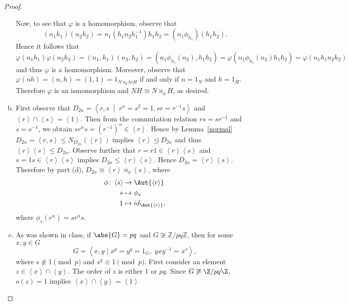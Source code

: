 \documentclass[10pt]{amsart}
\begin{document}
\begin{thm}
\begin{proof}
\begin{enumerate}[(a)]
      Now, to see that $\varphi$ is a homomorphism, observe that 
      $$(n_1h_1)(n_2h_2) = n_1(h_1n_2h_1^{-1})h_1h_2 = (n_1\phi_{h_1})(h_1h_2).$$
      Hence it follows that
      $$\varphi(n_1h_1)\varphi(n_2h_2) = (n_1, h_1)(n_2,h_2) = (n_1\phi_{h_1}(n_2), h_1h_2) = \varphi(n_1\phi_{h_1}(n_2)h_1h_2) = \varphi(n_1h_1n_2h_2)$$
      and thus $\varphi$ is a homomorphism.
      Moreover, observe that $\varphi(nh) = (n,h) = (1,1) = 1_{N \rtimes_phi H}$ if and only if $n = 1_N$ and $h = 1_H$.
      Therefore $\varphi$ is an ismomorphism and $NH \cong N \rtimes_{\phi} H$, as desired.
    \item
      First observe that $D_{2n} = \left< r, s \;\middle\vert\; r^n = s^2 = 1, sr = r^{-1}s\right>$ and $\left<r\right> \cap \left<s\right> = \left<1\right>$.
      Then from the commutation relation $rs = sr^{-1}$ and $s = s^{-1}$, we obtain $sr^\alpha s = (r^{-1})^\alpha \in \left<r\right>$.
      Hence by Lemma~\ref{normal} $D_{2n} = \left<r, s\right> \leq N_{D_{2n}}(\left<r\right>)$ implies $\left<r\right> \unlhd D_{2n}$ and thus $\left<r\right>\left<s\right> \leq D_{2n}$.
      Observe further that $r = r1 \in \left<r\right>\left<s\right>$ and $s = 1s \in \left<r\right>\left<s\right>$ implies $D_{2n} \leq \left<r\right>\left<s\right>$.
      Hence $D_{2n} = \left<r\right>\left<s\right>$.
      Therefore by part (d), $D_{2n} \cong \left<r\right> \rtimes_{\phi} \left<s\right>$, where 
      \begin{align*}
        \phi \colon \left<s\right> &\rightarrow \Aut{\left<r\right>}\\
        s &\mapsto \phi_{s}\\ 
        1 &\mapsto id_{\Aut{\left<r\right>}},
      \end{align*}
      where $\phi_{s}(r^\alpha) = s r^\alpha s$.
    \item
      As was shown in class, if $\abs{G} = pq$ and $G \not \cong \mathbb{Z}/pq\mathbb{Z}$, then for some $x,y \in G$
      $$G = \left< x, y \mid x^p = y^q = 1_G,\; yxy^{-1} = x^s\right>,$$
      where $s \not \equiv 1 \pmod{p}$ and $s^q \equiv 1 \pmod{p}$.
      First consider an element $z \in \left<x\right> \cap \left<y\right>$.
      The order of $z$ is either 1 or $pq$.
      Since $G \not \cong \Z/pq\Z$, $o(z) = 1$ implies $\left<x\right> \cap \left<y\right> = \left< 1 \right>$


\end{enumerate}
\end{proof}
\end{thm}
\end{document}
